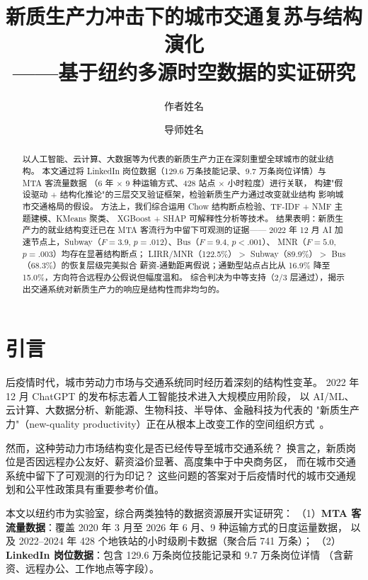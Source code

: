 \documentclass[runningheads]{llncs}
\title{新质生产力冲击下的城市交通复苏与结构演化\\
       ——基于纽约多源时空数据的实证研究}
\author{作者姓名\inst{1} \and 导师姓名\inst{1}}
\institute{某某大学~~~~某某学院\\
           \email{email@example.com}}
\begin{document}
\maketitle

\begin{abstract}
以人工智能、云计算、大数据等为代表的新质生产力正在深刻重塑全球城市的就业结构。
本文通过将 LinkedIn 岗位数据（129.6 万条技能记录、9.7 万条岗位详情）与 MTA 客流量数据
（6 年 $\times$ 9 种运输方式、428 站点 $\times$ 小时粒度）进行关联，
构建"假设驱动 + 结构化推论"的三层交叉验证框架，检验新质生产力通过改变就业结构
影响城市交通格局的假设。
方法上，我们综合运用 Chow 结构断点检验、TF-IDF + NMF 主题建模、KMeans 聚类、
XGBoost + SHAP 可解释性分析等技术。
结果表明：新质生产力的就业结构变迁已在 MTA 客流行为中留下可观测的证据——
2022 年 12 月 AI 加速节点上，Subway（$F=3.9$, $p=.012$）、Bus（$F=9.4$, $p<.001$）、
MNR（$F=5.0$, $p=.003$）均存在显著结构断点；
LIRR/MNR（122.5\%）$>$ Subway（89.9\%）$>$ Bus（68.3\%）的恢复层级完美拟合
薪资-通勤距离假说；通勤型站点占比从 16.9\% 降至 15.0\%，方向符合远程办公假说但幅度温和。
综合判决为中等支持（2/3 层通过），揭示出交通系统对新质生产力的响应是结构性而非均匀的。

\end{abstract}

\section{引言}

后疫情时代，城市劳动力市场与交通系统同时经历着深刻的结构性变革。
2022 年 12 月 ChatGPT 的发布标志着人工智能技术进入大规模应用阶段，
以 AI/ML、云计算、大数据分析、新能源、生物科技、半导体、金融科技为代表的
"新质生产力"（new-quality productivity）正在从根本上改变工作的空间组织方式~\cite{autor2023}。

然而，这种劳动力市场结构变化是否已经传导至城市交通系统？
换言之，新质岗位是否因远程办公友好、薪资溢价显著、高度集中于中央商务区，
而在城市交通系统中留下了可观测的行为印记？
这些问题的答案对于后疫情时代的城市交通规划和公平性政策具有重要参考价值。

本文以纽约市为实验室，综合两类独特的数据资源展开实证研究：
（1）\textbf{MTA 客流量数据}：覆盖 2020 年 3 月至 2026 年 6 月、9 种运输方式的日度运量数据，
以及 2022--2024 年 428 个地铁站的小时级刷卡数据（聚合后 741 万条）；
（2）\textbf{LinkedIn 岗位数据}：包含 129.6 万条岗位技能记录和 9.7 万条岗位详情
（含薪资、远程办公、工作地点等字段）。
\end{document}
